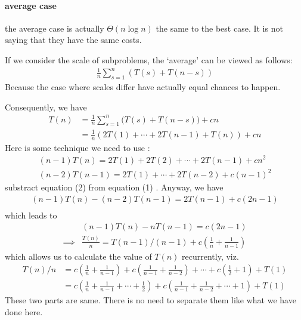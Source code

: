 \documentclass[a4paper, 10pt]{ctexart} %
\begin{document}
\paragraph{average case} %
\label{par:average case}
the average case is actually $\Theta \left( n \log n    \right)$ the same to the best case. It is not saying that they have the same costs.

If we consider the scale of subproblems, the `average' can be viewed as follows:
\begin{align*}
    \frac{1}{n} \sum_{s=1} ^{n} \left(T\left(s\right) + T \left(n  -s\right)\right) 
\end{align*}
Because the case where scales differ have actually equal chances to happen. 

Consequently, we have 
\begin{align*}
    T\left(n\right) & = \frac{1}{n} \sum_{ s = 1}  ^{n} \Big(T\left(s\right) + T\left( n -s\right)\Big) + cn\\
    & = \frac{1}{n} \left( 2 T \left(1\right) + \cdots  + 2 T\left( n -1\right) + T \left(n\right) \right) + cn
\end{align*}
Here is some technique we need to use : 
\begin{align*}
    \left(n  - 1\right) T\left(n\right) =  2 T\left(1 \right)  + 2 T\left(2\right)  +\cdots  + 2 T\left(n-1\right) + c n^{2} \tag{1} \\
    \left(n-2\right)  T\left(n - 1\right) =  2 T\left(1\right) + \cdots  + 2 T\left( n  -2   \right) + c \left(n - 1\right) ^{2} \tag{2} 
\end{align*}
substract equation (2) from equation (1) . Anyway, we have 
\begin{align*}
    \left(n  - 1\right) T\left(n\right)  -  \left(n  -2\right)  T\left( n -1\right)  = 2 T\left(n - 1\right) +c \left(2 n - 1\right)  \\
\end{align*}
which leads to 
\begin{align*}
    & \left(n - 1\right) T\left(n\right)   - n T\left( n -1\right) = c \left( 2n -1 \right) \\
    \implies & \frac{T\left(n\right) }{ n}  = T\left( n-1   \right) / \left(  n -1\right) + c \left( \frac{1}{n} + \frac{1}{n-1}\right)
\end{align*}
which allows us to calculate the value of $T\left(n\right) $ recurrently, viz. 
\begin{align*}
    T \left(n\right) / n & = c \left( \frac{1}{n} + \frac{1}{n -1} \right) + c \left( \frac{1}{n-1} + \frac{1}{n-2} \right) + \cdots  + c \left(\frac{1}{2} + 1 \right) + T (1 ) \\
    & = c \left( \frac{1}{n } + \frac{1}{n-1    } + \cdots + \frac{1}{2} \right) + c \left( \frac{1}{n-1} + \frac{1}{n-2} + \cdots   + 1\right)  + T\left(1\right)
\end{align*}
These two parts are same. There is no need to separate them like what we have done here.
\end{document}
